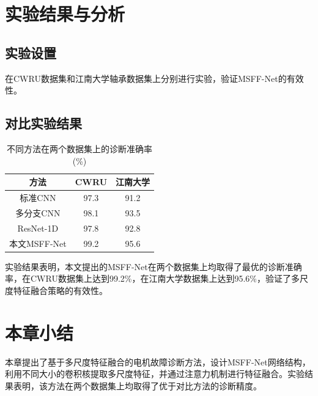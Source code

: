 \section{实验结果与分析}

\subsection{实验设置}

在CWRU数据集和江南大学轴承数据集上分别进行实验，验证MSFF-Net的有效性。

\subsection{对比实验结果}

\begin{table}[htbp]
	\centering
	\caption{不同方法在两个数据集上的诊断准确率(\%)}
	\label{tab:msff_results}
	\begin{tabular}{ccc}
		\toprule
		方法 & CWRU & 江南大学 \\
		\midrule
		标准CNN & 97.3 & 91.2 \\
		多分支CNN & 98.1 & 93.5 \\
		ResNet-1D & 97.8 & 92.8 \\
		本文MSFF-Net & 99.2 & 95.6 \\
		\bottomrule
	\end{tabular}
\end{table}

实验结果表明，本文提出的MSFF-Net在两个数据集上均取得了最优的诊断准确率，在CWRU数据集上达到99.2\%，在江南大学数据集上达到95.6\%，验证了多尺度特征融合策略的有效性。

\section{本章小结}

本章提出了基于多尺度特征融合的电机故障诊断方法，设计MSFF-Net网络结构，利用不同大小的卷积核提取多尺度特征，并通过注意力机制进行特征融合。实验结果表明，该方法在两个数据集上均取得了优于对比方法的诊断精度。